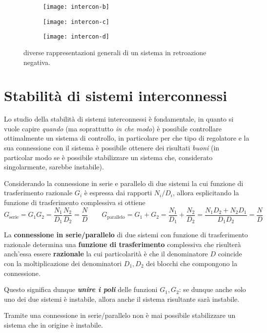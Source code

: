 		\begin{figure}[bht]
			\centering
			\begin{subfigure}{0.325\linewidth}
				\centering \texttt{[image: intercon-b]} \caption{}
			\end{subfigure}
			\begin{subfigure}{0.325\linewidth}
				\centering \texttt{[image: intercon-c]} \caption{}
			\end{subfigure}
			\begin{subfigure}{0.325\linewidth}
				\centering \texttt{[image: intercon-d]} \caption{}
			\end{subfigure}
			\caption{diverse rappresentazioni generali di un sistema in retroazione negativa.}
			\label{fig:int:rappsimili}
		\end{figure}
		
\section{Stabilità di sistemi interconnessi}
	Lo studio della stabilità di sistemi interconnessi è fondamentale, in quanto si vuole capire \textit{quando} (ma soprattutto \textit{in che modo}) è possibile controllare ottimalmente un sistema di controllo, in particolare per che tipo di regolatore e la sua connessione con il sistema è possibile ottenere dei risultati \textit{buoni} (in particolar modo se è possibile stabilizzare un sistema che, considerato singolarmente, sarebbe instabile).
	
	Considerando la connessione in serie e parallelo di due sistemi la cui funzione di trasferimento razionale $G_i$ è espressa dai rapporti $N_i/D_i$, allora esplicitando la funzione di trasferimento complessiva si ottiene
	\[ G_\textrm{serie} =G_1G_2 = \frac{N_1}{D_1} \frac{N_2}{D_2} = \frac N D \qquad G_\textrm{parallelo} = G_1 + G_2 = \frac{N_1}{D_1}+ \frac{N_2}{D_2} = \frac{N_1D_2 + N_2D_1}{D_1D_2} = \frac N D  \]
	
	\begin{concetto}
		La \textbf{connessione in serie/parallelo} di due sistemi con funzione di trasferimento razionale determina una \textbf{funzione di trasferimento} complessiva che risulterà anch'essa essere \textbf{razionale} la cui particolarità è che il denominatore $D$ coincide con la moltiplicazione dei denominatori $D_1,D_2$ dei blocchi che compongono la connessione.
		
		Questo significa dunque \textbf{\textit{unire i poli}} delle funzioni $G_1,G_2$: se dunque anche solo uno dei due sistemi è instabile, allora anche il sistema risultante sarà instabile.
	\end{concetto}
	Tramite una connessione in serie/parallelo non è mai possibile stabilizzare un sistema che in origine è instabile.
	
